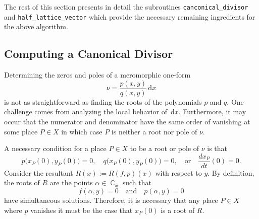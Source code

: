 \documentclass[12pt]{article}
\theoremstyle{definition}
\DeclareMathOperator{\CC}{\mathbb{C}}
\newcommand{\dx}{\,\mathrm{d}x}
\begin{document}
The rest of this section presents in detail the subroutines
\verb=canconical_divisor= and \verb=half_lattice_vector= which provide
the necessary remaining ingredients for the above algorithm.



\subsection{Computing a Canonical Divisor}\label{sec:canonical}



Determining the zeros and poles of a meromorphic one-form
\begin{equation} \label{eqn:meromorphic-one-form}
\nu = \frac{p(x,y)}{q(x,y)}\dx
\end{equation}
is not as straightforward as finding the roots of the polynomials $p$
and $q$. One challenge comes from analyzing the local behavior of
$\dx$. Furthermore, it may occur that the numerator and denominator have
the same order of vanishing at some place $P \in X$ in which case $P$ is
neither a root nor pole of $\nu$.

A necessary condition for a place $P \in X$ to be a root or pole of
$\nu$ is that
\begin{equation}
  p\big(x_P(0), y_P(0)\big) = 0,
  \quad
  q\big(x_P(0), y_P(0)\big) = 0,
  \quad \text{or} \quad
  \frac{dx_P}{dt}(0) = 0.
\end{equation}
Consider the resultant $R(x) := R(f,p)(x)$ with respect to $y$. By
definition, the roots of $R$ are the points $\alpha \in \CC_x$ such that
\begin{equation}
f(\alpha,y) = 0 \quad \text{and} \quad p(\alpha, y) = 0
\end{equation}
have simultaneous solutions. Therefore, it is necessary that any place
$P \in X$ where $p$ vanishes it must be the case that $x_P(0)$ is a root
of $R$.
\end{document}
